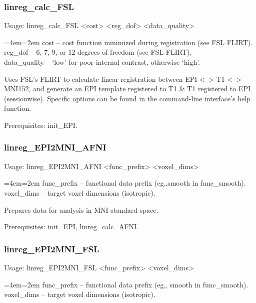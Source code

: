 \documentclass[final,titlepage,letterpaper,oneside,12pt]{article}
\renewcommand{\texttt}[2][BrickRed]{\textcolor{#1}{\ttfamily #2}}%
\newenvironment{blockquote}{%
  \par%
  \medskip
  \leftskip=4em\rightskip=2em%
  \noindent\ignorespaces}{%
  \par\medskip}
\begin{document}
\subsubsection{linreg\_calc\_FSL}
Usage: \texttt{linreg\_calc\_FSL <cost> <reg\_dof> <data\_quality>}

\begin{blockquote}
cost -- cost function minimized during registration (see FSL FLIRT). \\
reg\_dof -- 6, 7, 9, or 12 degrees of freedom (see FSL FLIRT), \\
data\_quality -- `low' for poor internal contrast, otherwise `high'. \
\end{blockquote}

\noindent Uses FSL's FLIRT to calculate linear registration between EPI <--> T1 <--> MNI152, and generate an EPI template registered to T1 \& T1 registered to EPI (sessionwise). Specific options can be found in the command-line interface's help function.

Prerequisites: \texttt{init\_EPI}.

\subsubsection{linreg\_EPI2MNI\_AFNI}
Usage: \texttt{linreg\_EPI2MNI\_AFNI <func\_prefix> <voxel\_dims>}

\begin{blockquote}
func\_prefix -- functional data prefix (eg.,smooth in func\_smooth). \\
voxel\_dims -- target voxel dimensions (isotropic). \
\end{blockquote}

\noindent Prepares data for analysis in MNI standard space.

Prerequisites: \texttt{init\_EPI}, \texttt{linreg\_calc\_AFNI}.

\subsubsection{linreg\_EPI2MNI\_FSL}
Usage: \texttt{linreg\_EPI2MNI\_FSL <func\_prefix> <voxel\_dims>}

\begin{blockquote}
func\_prefix -- functional data prefix (eg., smooth in func\_smooth). \\
voxel\_dims -- target voxel dimensions (isotropic). \
\end{blockquote}
\end{document}
